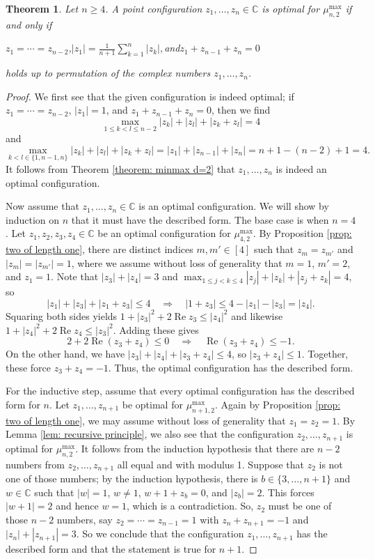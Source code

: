 \documentclass[reqno,hidelinks,11pt]{amsart}
\numberwithin{equation}{section}
\newtheorem{theorem}{Theorem}[section]
\def\CC{\mathbb{C}}
\def\Re{\operatorname{Re}}
\begin{document}
\begin{theorem}\label{theorem: optimal config d=2}
    Let $n \geq 4$. A point configuration $z_1,\ldots,z_n \in \CC$ is optimal for $\mu_{n,2}^{\max}$ if and only if 
    \begin{center}
        $z_1=\cdots = z_{n-2}$,\quad $|z_1|=\frac{1}{n+1}\sum_{k=1}^n|z_k|,$\quad and\quad $z_1+z_{n-1}+z_n=0$
    \end{center}  
    holds up to permutation of the complex numbers $z_1,\ldots,z_n$.
\end{theorem}
\begin{proof} We first see that the given configuration is indeed optimal; if $z_1=\cdots = z_{n-2}$, $|z_1| =1$, and $z_1+z_{n-1}+z_n=0$, then we find 
\[
\max_{1 \leq k < l \leq n-2}|z_k|+|z_l|+|z_k+z_l| = 4
\]
and 
\[
\max_{k<l \in \{1,n-1,n\}}|z_k|+|z_l|+|z_k+z_l|=|z_1|+|z_{n-1}|+|z_n|=n+1-(n-2)+1=4.
\]
It follows from Theorem \ref{theorem: minmax d=2} that $z_1,\ldots,z_n$ is indeed an optimal configuration.

Now assume that $z_1, \ldots, z_n \in \CC$  is an optimal configuration. We will show by induction on $n$ that it must have the described form. 
The base case is when $n = 4$. Let $z_1,z_2,z_3,z_4 \in \CC$ be an optimal configuration for $\mu_{4, 2}^{\max}$. By Proposition \ref{prop: two of length one}, there are distinct indices $m, m' \in [4]$ such that $z_m = z_{m'}$ and $|z_m| = |z_{m'}| = 1$, where we  assume without loss of generality that $m = 1$, $m' = 2$, and $z_1 = 1$.
Note that $|z_3|+|z_4|=3$ and $\max_{1 \leq j < k \leq 4} |z_j| + |z_k| + |z_j + z_k| = 4$, so
\[
|z_1| + |z_3| + |z_1 + z_3| \leq 4 \quad \Rightarrow \quad |1 + z_3| \leq 4 - |z_1| - |z_3| = |z_4|.
\]
Squaring both sides yields $1 + |z_3|^2 + 2\Re z_3 \leq |z_4|^2$ and likewise $1 + |z_4|^2 + 2\Re z_4 \leq |z_3|^2$. Adding these gives \[
2 + 2\Re (z_3 + z_4) \leq 0 \quad \Rightarrow \quad \Re (z_3 + z_4) \leq -1.
\]
On the other hand, we have $
|z_3| + |z_4| + |z_3 + z_4| \leq 4$, so $|z_3 + z_4| \leq 1.
$
Together, these force $z_3 + z_4 = -1$. Thus, the optimal configuration has the described form.

For the inductive step, assume that every optimal configuration has the described form for $n$. Let $z_1,\ldots,z_{n+1}$ be optimal for $\mu_{n+1,2}^{\max}$. Again by Proposition \ref{prop: two of length one}, we may assume without loss of generality that $z_1 = z_2 = 1$. By Lemma \ref{lem: recursive principle}, we also see that the configuration $z_2,\ldots,z_{n+1}$ is optimal for $\mu_{n, 2}^{\max}$. It follows from the induction hypothesis that there are $n - 2$ numbers from $z_2, \ldots, z_{n + 1}$ all equal and with modulus 1. Suppose that $z_2$ is not one of those numbers; by the induction hypothesis, there is $b \in \{3, \ldots, n + 1\}$ and $w \in \CC$ such that $|w| = 1$, $w \neq 1$, $w + 1 + z_b = 0$, and $|z_b| = 2$. This forces $|w + 1| = 2$ and hence $w = 1$, which is a contradiction. So, $z_2$ must be one of those $n - 2$ numbers, say $z_2 = \cdots = z_{n-1} = 1$ with $z_n+z_{n+1}=-1$ and $|z_{n}|+|z_{n+1}|=3$. So we conclude that the configuration $z_1, \ldots, z_{n + 1}$ has the described form and that the statement is true for $n + 1$.
\end{proof}
\end{document}
